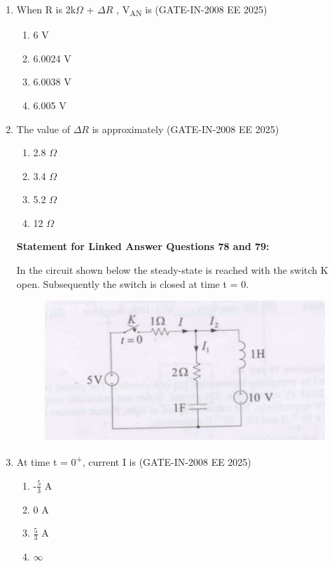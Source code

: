 \documentclass[journal,12pt,onecolumn]{IEEEtran}
\theoremstyle{remark}
\begin{document}
\begin{enumerate}[label=Q.\arabic*,start=1]
\item When R is 2k$\Omega$ + $\Delta$$R$ , V\textsubscript{AN} is (GATE-IN-2008 EE 2025)
           \begin{enumerate} 
              \item 6 V
              \item 6.0024 V
              \item 6.0038 V
              \item 6.005 V
            \end{enumerate}




\item The value of $\Delta$$R$ is approximately (GATE-IN-2008 EE 2025)
           \begin{enumerate} 
              \item  2.8 $\Omega$       
              \item  3.4 $\Omega$
              \item  5.2 $\Omega$
              \item  12 $\Omega$
            \end{enumerate}

\textbf{Statement for Linked Answer Questions 78 and 79:}

In the circuit shown below the steady-state is reached with the switch K open. Subsequently the switch is
closed at time t = 0.

\begin{figure}[H]
    \centering
    \includegraphics[width=0.5\linewidth]{figs/i34.jpg}
    \label{fig:placeholder34}
\end{figure}

\item  At time t = 0\textsuperscript{+}, current I is (GATE-IN-2008 EE 2025)
           \begin{enumerate} 
              \item  -$\frac{5}{3}$ A    
              \item  0 A
              \item  $\frac{5}{3}$ A
              \item  $\infty$
            \end{enumerate}



\end{enumerate}
\end{document}
